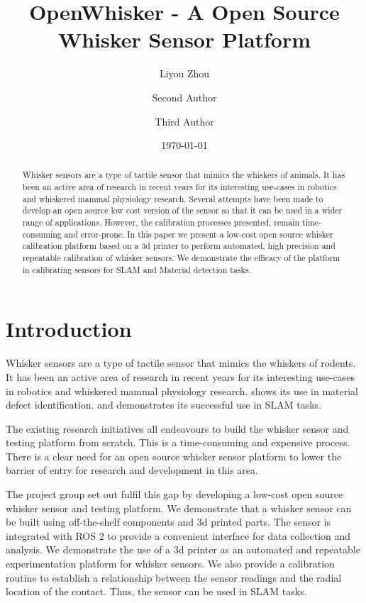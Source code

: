 \documentclass[runningheads]{llncs}
\title{OpenWhisker - A Open Source Whisker Sensor Platform}
\author{Liyou Zhou\inst{1}\orcidID{0009-0005-9491-9003} \and
Second Author\inst{1}\orcidID{1111-2222-3333-4444} \and
Third Author\inst{1}\orcidID{2222--3333-4444-5555}}
\institute{University of Lincoln, Lincoln, UK}
\date{\today}
\begin{document}
\maketitle

\begin{abstract}
    Whisker sensors are a type of tactile sensor that mimics the whiskers of animals. It has been an active area of research in recent years for its interesting use-cases in robotics and whiskered mammal physiology research\cite{prescottActiveTouchSensing2020}. Several attempts have been made to develop an open source low cost version of the sensor so that it can be used in a wider range of applications. However, the calibration processes presented, remain time-consuming and error-prone. In this paper we present a low-cost open source whisker calibration platform based on a 3d printer to perform automated, high precision and repeatable calibration of whisker sensors. We demonstrate the efficacy of the platform in calibrating sensors for SLAM and Material detection tasks.
    
\end{abstract}

\section{Introduction}

Whisker sensors are a type of tactile sensor that mimics the whiskers of rodents. It has been an active area of research in recent years for its interesting use-cases in robotics and whiskered mammal physiology research\cite{prescottActiveTouchSensing2020}. \cite{fotouhiDetectionBarelyVisible2021} shows its use in material defect identification. \cite{struckmeierViTaSLAMBioinspiredVisuoTactile2019} and \cite{foxTactileSLAMBiomimetic2012} demonstrates its successful use in SLAM tasks.

The existing research initiatives all endeavours to build the whisker sensor and testing platform from scratch. This is a time-consuming and expensive process. There is a clear need for an open source whisker sensor platform to lower the barrier of entry for research and development in this area.

The project group set out fulfil this gap by developing a low-cost open source whisker sensor and testing platform. We demonstrate that a whisker sensor can be built using off-the-shelf components and 3d printed parts. The sensor is integrated with ROS 2 to provide a convenient interface for data collection and analysis. We demonstrate the use of a 3d printer as an automated and repeatable experimentation platform for whisker sensors. We also provide a calibration routine to establish a relationship between the sensor readings and the radial location of the contact. Thus, the sensor can be used in SLAM tasks.
\end{document}
